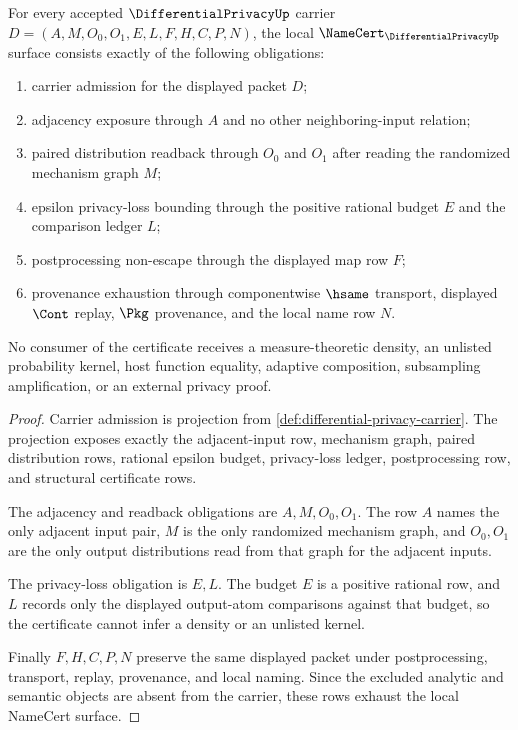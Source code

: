 \begin{theorem}
\label{thm:differential-privacy-namecert-obligations}
For every accepted $\DifferentialPrivacyUp$ carrier
$D=(A,M,O_0,O_1,E,L,F,H,C,P,N)$, the local $\NameCert_{\DifferentialPrivacyUp}$ surface consists exactly of the following obligations:
\begin{enumerate}
\item carrier admission for the displayed packet $D$;
\item adjacency exposure through $A$ and no other neighboring-input relation;
\item paired distribution readback through $O_0$ and $O_1$ after reading the randomized mechanism graph $M$;
\item epsilon privacy-loss bounding through the positive rational budget $E$ and the comparison ledger $L$;
\item postprocessing non-escape through the displayed map row $F$;
\item provenance exhaustion through componentwise $\hsame$ transport, displayed $\Cont$ replay, $\Pkg$ provenance, and the local name row $N$.
\end{enumerate}
No consumer of the certificate receives a measure-theoretic density, an unlisted probability kernel, host function equality, adaptive composition, subsampling amplification, or an external privacy proof.
\end{theorem}
\begin{proof}
Carrier admission is projection from \autoref{def:differential-privacy-carrier}. The projection exposes exactly the adjacent-input row, mechanism graph, paired distribution rows, rational epsilon budget, privacy-loss ledger, postprocessing row, and structural certificate rows.

The adjacency and readback obligations are $A,M,O_0,O_1$. The row $A$ names the only adjacent input pair, $M$ is the only randomized mechanism graph, and $O_0,O_1$ are the only output distributions read from that graph for the adjacent inputs.

The privacy-loss obligation is $E,L$. The budget $E$ is a positive rational row, and $L$ records only the displayed output-atom comparisons against that budget, so the certificate cannot infer a density or an unlisted kernel.

Finally $F,H,C,P,N$ preserve the same displayed packet under postprocessing, transport, replay, provenance, and local naming. Since the excluded analytic and semantic objects are absent from the carrier, these rows exhaust the local NameCert surface.
\end{proof}

